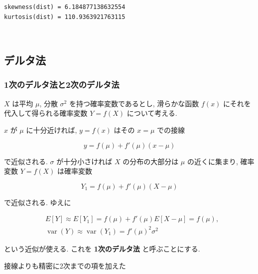 \documentclass[10pt, a4paper,xelatex,ja=standard]{bxjsarticle}
\newcommand{\prompt}[4]{
        \ttfamily\llap{{\color{#2}[#3]:\hspace{3pt}#4}}\vspace{-\baselineskip}
    }
\newcommand\op{\operatorname}
\begin{document}
    \begin{Verbatim}[commandchars=\\\{\}]
skewness(dist) = 6.184877138632554
kurtosis(dist) = 110.9363921763115
    \end{Verbatim}
 
            
\prompt{Out}{outcolor}{91}{}
    
    \begin{center}
    \end{center}
    { \hspace*{\fill} \\}
    

    \hypertarget{ux30c7ux30ebux30bfux6cd5}{%
\subsection{デルタ法}\label{ux30c7ux30ebux30bfux6cd5}}

    \hypertarget{ux6b21ux306eux30c7ux30ebux30bfux6cd5ux30682ux6b21ux306eux30c7ux30ebux30bfux6cd5}{%
\subsubsection{1次のデルタ法と2次のデルタ法}\label{ux6b21ux306eux30c7ux30ebux30bfux6cd5ux30682ux6b21ux306eux30c7ux30ebux30bfux6cd5}}

\(X\) は平均 \(\mu\), 分散 \(\sigma^2\) を持つ確率変数であるとし,
滑らかな函数 \(f(x)\) にそれを代入して得られる確率変数 \(Y=f(X)\)
について考える.

\(x\) が \(\mu\) に十分近ければ, \(y = f(x)\) はその \(x = \mu\)
での接線

\[
y = f(\mu) + f'(\mu)(x - \mu)
\]

で近似される. \(\sigma\) が十分小さければ \(X\) の分布の大部分は \(\mu\)
の近くに集まり, 確率変数 \(Y = f(X)\) は確率変数

\[
Y_1 = f(\mu) + f'(\mu)(X - \mu)
\]

で近似される. ゆえに

\[
\begin{aligned}
&
E[Y] \approx E[Y_1] = f(\mu) + f'(\mu)E[X - \mu] = f(\mu),
\\ &
\op{var}(Y) \approx \op{var}(Y_1) = f'(\mu)^2\sigma^2
\end{aligned}
\]

という近似が使える. これを \textbf{1次のデルタ法} と呼ぶことにする.

接線よりも精密に2次までの項を加えた
\end{document}
